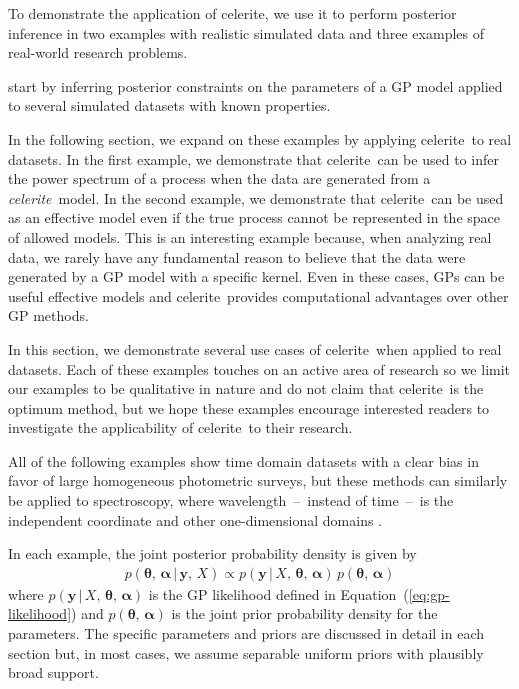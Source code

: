 \documentclass[manuscript, letterpaper]{aastex6}
\newcommand{\project}[1]{\textsf{#1}}
\newcommand{\celerite}{\project{celerite}}
\newcommand{\celeriteterm}{\emph{celerite}}
\renewcommand{\eqref}[1]{\ref{eq:#1}}
\newcommand{\Eq}[1]{Equation~(\eqref{#1})}
\newcommand{\eq}[1]{\Eq{#1}}
\newcommand{\eqlabel}[1]{\label{eq:#1}}
\newcommand{\bvec}[1]{{\ensuremath{\boldsymbol{#1}}}}
\newcommand{\response}[1]{{\color{blue}#1}}
\begin{document}
To demonstrate the application of \celerite, we use it to perform posterior
inference in two examples with realistic simulated data and three examples of
real-world research problems.

start by inferring
posterior constraints on the parameters of a GP model applied to several
simulated datasets with known properties.

In the following section, we expand on these examples by applying
\celerite\ to real datasets.
In the first example, we demonstrate that \celerite\ can be used to infer
the power spectrum of a process when the data are generated from a
\celeriteterm\ model.
In the second example, we demonstrate that \celerite\ can be used as an
effective model even if the true process cannot be represented in the space of
allowed models.
This is an interesting example because, when analyzing real data, we rarely
have any fundamental reason to believe that the data were generated by a GP
model with a specific kernel.
Even in these cases, GPs can be useful effective models and \celerite\
provides computational advantages over other GP methods.

In this section, we demonstrate several use cases of \celerite\ when
applied to real datasets.
Each of these examples touches on an active area of research so we limit our
examples to be qualitative in nature and do not claim that \celerite\ is the
optimum method, but we hope these examples encourage interested readers to
investigate the applicability of \celerite\ to their research.

All of the following examples show time domain datasets with a clear bias in
favor of large homogeneous photometric surveys, but these methods can
similarly be applied to spectroscopy, where wavelength~--~instead of
time~--~is the independent coordinate and other one-dimensional domains
\citep[see][for a potential application]{Czekala:2017}.

\response{In each example, the joint posterior probability density is given by
\begin{eqnarray}\eqlabel{joint-post}
p(\bvec{\theta},\,\bvec{\alpha}\,|\,\bvec{y},\,X) \propto
p(\bvec{y}\,|\,{X,\,\bvec{\theta}},\,\bvec{\alpha})\,
p(\bvec{\theta},\,\bvec{\alpha})
\end{eqnarray}
where $p(\bvec{y}\,|\,{X,\,\bvec{\theta}},\,\bvec{\alpha})$ is the GP
likelihood defined in \eq{gp-likelihood} and
$p(\bvec{\theta},\,\bvec{\alpha})$ is the joint prior probability density for
the parameters.
The specific parameters and priors are discussed in detail in each section
but, in most cases, we assume separable uniform priors with plausibly broad
support.
}
\end{document}
